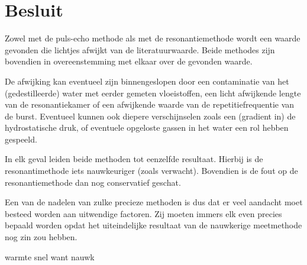 \section{Besluit}
Zowel met de puls-echo methode als met de resonantiemethode wordt een 
waarde gevonden die lichtjes afwijkt van de literatuurwaarde. Beide 
methodes zijn bovendien in overeenstemming met elkaar over de gevonden 
waarde.

De afwijking kan eventueel zijn binnengeslopen door een contaminatie van 
het (gedestilleerde) water met eerder gemeten vloeistoffen, een licht 
afwijkende lengte van de resonantiekamer of een afwijkende waarde van de 
repetitiefrequentie van de burst. Eventueel kunnen ook diepere 
verschijnselen zoals een (gradient in) de hydrostatische druk, of eventuele 
opgeloste gassen in het water een rol hebben gespeeld.

In elk geval leiden beide methoden tot eenzelfde resultaat. Hierbij is de 
resonantimethode iets nauwkeuriger (zoals verwacht). Bovendien is de fout 
op de resonantiemethode dan nog conservatief geschat.

Een van de nadelen van zulke precieze methoden is dus dat er veel aandacht 
moet besteed worden aan uitwendige factoren. Zij moeten immers elk even 
precies bepaald worden opdat het uiteindelijke resultaat van de nauwkerige 
meetmethode nog zin zou hebben.


warmte snel want nauwk
